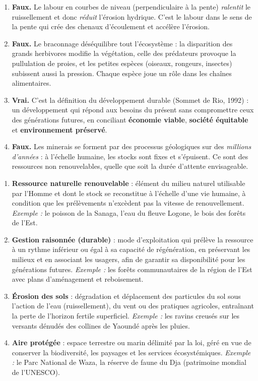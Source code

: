 \documentclass[11pt]{article}
\newcommand{\cle}[1]{{\popxbold\color{popdark}#1}}
\begin{document}
\begin{corrige}
\begin{enumerate}
\item \textbf{Faux.} Le labour en \cle{courbes de niveau} (perpendiculaire à la pente) \emph{ralentit} le ruissellement et donc \emph{réduit} l'érosion hydrique. C'est le labour dans le sens de la pente qui crée des chenaux d'écoulement et accélère l'érosion.
\item \textbf{Faux.} Le braconnage déséquilibre tout l'écosystème : la disparition des grands herbivores modifie la végétation, celle des prédateurs provoque la pullulation de proies, et les petites espèces (oiseaux, rongeurs, insectes) subissent aussi la pression. Chaque espèce joue un rôle dans les chaînes alimentaires.
\item \textbf{Vrai.} C'est la définition du développement durable (Sommet de Rio, 1992) : un développement qui répond aux besoins du présent sans compromettre ceux des générations futures, en conciliant \textbf{économie viable}, \textbf{société équitable} et \textbf{environnement préservé}.
\item \textbf{Faux.} Les minerais se forment par des processus géologiques sur des \emph{millions d'années} : à l'échelle humaine, les stocks sont fixes et s'épuisent. Ce sont des ressources \cle{non renouvelables}, quelle que soit la durée d'attente envisageable.
\end{enumerate}
\end{corrige}

\begin{corrige}
\begin{enumerate}
\item \textbf{Ressource naturelle renouvelable} : élément du milieu naturel utilisable par l'Homme et dont le stock se reconstitue à l'échelle d'une vie humaine, à condition que les prélèvements n'excèdent pas la vitesse de renouvellement. \emph{Exemple :} le poisson de la Sanaga, l'eau du fleuve Logone, le bois des forêts de l'Est.
\item \textbf{Gestion raisonnée (durable)} : mode d'exploitation qui prélève la ressource à un rythme inférieur ou égal à sa capacité de régénération, en préservant les milieux et en associant les usagers, afin de garantir sa disponibilité pour les générations futures. \emph{Exemple :} les forêts communautaires de la région de l'Est avec plans d'aménagement et reboisement.
\item \textbf{Érosion des sols} : dégradation et déplacement des particules du sol sous l'action de l'eau (ruissellement), du vent ou des pratiques agricoles, entraînant la perte de l'horizon fertile superficiel. \emph{Exemple :} les ravins creusés sur les versants dénudés des collines de Yaoundé après les pluies.
\item \textbf{Aire protégée} : espace terrestre ou marin délimité par la loi, géré en vue de conserver la biodiversité, les paysages et les services écosystémiques. \emph{Exemple :} le Parc National de Waza, la réserve de faune du Dja (patrimoine mondial de l'UNESCO).
\end{enumerate}
\end{corrige}
\end{document}
